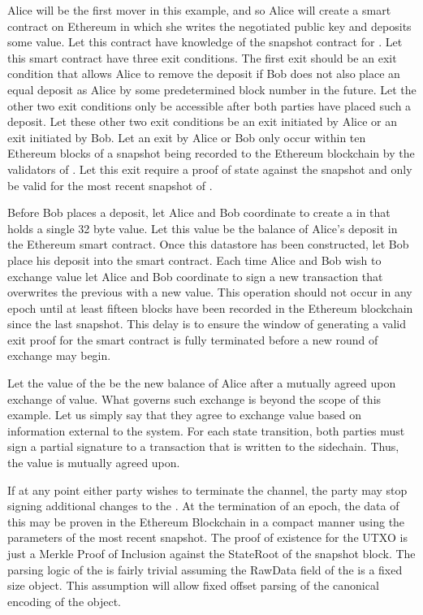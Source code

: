 Alice will be the first mover in this example, and so Alice will create
a smart contract on Ethereum in which she writes the negotiated public
key and deposits some value.
Let this contract have knowledge of the snapshot contract for
\LayerTwo{}.
Let this smart contract have three exit conditions.
The first exit should be an exit condition that allows Alice to remove
the deposit if Bob does not also place an equal deposit as Alice by
some predetermined block number in the future.
Let the other two exit conditions only be accessible after both parties
have placed such a deposit.
Let these other two exit conditions be an exit initiated by Alice or an
exit initiated by Bob.
Let an exit by Alice or Bob only occur within ten Ethereum blocks of a
snapshot being recorded to the Ethereum blockchain by the validators of
\LayerTwo{}.
Let this exit require a proof of state against the snapshot and only be
valid for the most recent snapshot of \LayerTwo{}.

Before Bob places a deposit, let Alice and Bob coordinate to create a
\DataStore{} in \LayerTwo{} that holds a single 32 byte value.
Let this value be the balance of Alice’s deposit in the Ethereum
smart contract.
Once this datastore has been constructed, let Bob place his deposit
into the smart contract.
Each time Alice and Bob wish to exchange value let Alice and Bob
coordinate to sign a new transaction that overwrites the previous
\DataStore{} with a new value.
This operation should not occur in any epoch until at least fifteen
blocks have been recorded in the Ethereum blockchain since the last
snapshot.
This delay is to ensure the window of generating a valid exit proof for
the smart contract is fully terminated before a new round of exchange
may begin.

Let the value of the \DataStore{} be the new balance of Alice after a
mutually agreed upon exchange of value.
What governs such exchange is beyond the scope of this example.
Let us simply say that they agree to exchange value based on
information external to the system.
For each state transition, both parties must sign a partial signature
to a transaction that is written to the sidechain.
Thus, the value is mutually agreed upon.

If at any point either party wishes to terminate the channel, the party
may stop signing additional changes to the \DataStore{}.
At the termination of an epoch, the data of this \DataStore{} may be
proven in the Ethereum Blockchain in a compact manner using the
parameters of the most recent snapshot.
The proof of existence for the \DataStore{} UTXO is just a Merkle Proof of
Inclusion against the StateRoot of the snapshot block.
The parsing logic of the \DataStore{} is fairly trivial assuming the
RawData field of the \DataStore{} is a fixed size object.
This assumption will allow fixed offset parsing of the canonical
encoding of the \DataStore{} object.

